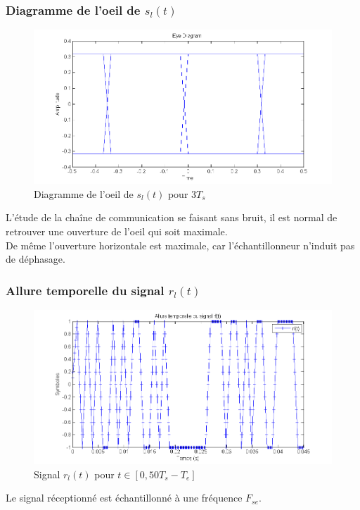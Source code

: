 \documentclass[11pt]{article}
\begin{document}
		\subsubsection{Diagramme de l'oeil de $s_l(t)$}
			\begin{figure}[h]
				\centering
				\includegraphics[scale=0.5]{images/Q312.png}
				\caption{Diagramme de l'oeil de $s_l(t)$ pour $3T_s$}
				\label{Q312}
			\end{figure}
			L'étude de la chaîne de communication se faisant sans bruit, il est normal de retrouver une ouverture de l'oeil qui soit maximale.\\
			De même l'ouverture horizontale est maximale, car l'échantillonneur n'induit pas de déphasage.
			
		\subsubsection{Allure temporelle du signal $r_l(t)$}
			\begin{figure}[h]
				\centering
				\includegraphics[scale=0.5]{images/Q313.png}
				\caption{Signal $r_l(t)$ pour $t \in [0, 50T_s-T_e]$}
				\label{Q313}
			\end{figure}
			Le signal réceptionné est échantillonné à une fréquence $F_{se}$.
		
\end{document}
